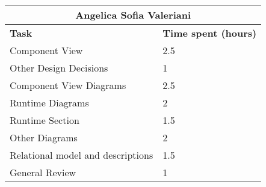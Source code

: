 \begin{table}[H]
  \center
  \begin{tabular}{l|l}
    \multicolumn{2}{c}{\textbf{Angelica Sofia Valeriani}} \\
    \hline
    \textbf{Task} & \textbf{Time spent (hours)}\\
    \hline
    Component View & 2.5 \\
    Other Design Decisions & 1 \\
    Component View Diagrams & 2.5 \\
    Runtime Diagrams & 2 \\
    Runtime Section & 1.5 \\
    Other Diagrams & 2 \\
    Relational model and descriptions & 1.5 \\
    General Review & 1 \\
  \end{tabular}
\end{table}